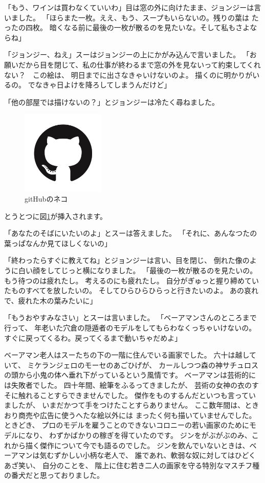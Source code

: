 「もう、ワインは買わなくていいわ」目は窓の外に向けたまま、ジョンジーは言いました。 「ほらまた一枚。ええ、もう、スープもいらないの。残りの葉は たったの四枚。 暗くなる前に最後の一枚が散るのを見たいな。そして私もさよならね」

「ジョンジー、ねえ」スーはジョンジーの上にかがみ込んで言いました。 「お願いだから目を閉じて、私の仕事が終わるまで窓の外を見ないって約束してくれない？　この絵は、 明日までに出さなきゃいけないのよ。 描くのに明かりがいるの。 でなきゃ日よけを降ろしてしまうんだけど」

「他の部屋では描けないの？」とジョンジーは冷たく尋ねました。


\begin{figure}[htbp]
	\centering
		\includegraphics[width=4cm]{img/image1.png}
	\caption{gitHubのネコ}
	\label{neko}
\end{figure}

とうとつに図\ref{neko}が挿入されます。

「あなたのそばにいたいのよ」とスーは答えました。 「それに、あんなつたの葉っぱなんか見てほしくないの」

「終わったらすぐに教えてね」とジョンジーは言い、目を閉じ、 倒れた像のように白い顔をしてじっと横になりました。 「最後の一枚が散るのを見たいの。もう待つのは疲れたし。 考えるのにも疲れたし。 自分がぎゅっと握り締めていたものすべてを放したいの。 そしてひらひらひらっと行きたいのよ。 あの哀れで、疲れた木の葉みたいに」

「もうおやすみなさい」とスーは言いました。 「ベーアマンさんのところまで行って、 年老いた穴倉の隠遁者のモデルをしてもらわなくっちゃいけないの。 すぐに戻ってくるわ。戻ってくるまで動いちゃだめよ」

ベーアマン老人はスーたちの下の一階に住んでいる画家でした。 六十は越していて、 ミケランジェロのモーセのあごひげが、 カールしつつ森の神サチュロスの頭から小鬼の体へ垂れ下がっているという風情です。 ベーアマンは芸術的には失敗者でした。 四十年間、絵筆をふるってきましたが、 芸術の女神の衣のすそに触れることすらできませんでした。 傑作をものするんだといつも言っていましたが、 いまだかつて手をつけたことすらありません。 ここ数年間は、ときおり商売や広告に使うへたな絵以外には まったく何も描いていませんでした。 ときどき、 プロのモデルを雇うことのできないコロニーの若い画家のためにモデルになり、 わずかばかりの稼ぎを得ていたのです。 ジンをがぶがぶのみ、これから描く傑作について今でも語るのでした。 ジンを飲んでいないときは、ベーアマンは気むずかしい小柄な老人で、 誰であれ、軟弱な奴に対してはひどくあざ笑い、 自分のことを、 階上に住む若き二人の画家を守る特別なマスチフ種の番犬だと思っておりました。

